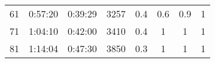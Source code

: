 \begin{table*}[]
\begin{center}
\begin{tabular}{c|cc|c|cccc}
61                       & 0:57:20                     & 0:39:29                                                                           & 3257                                & 0.4         & 0.6                 & \multicolumn{1}{c|}{0.9} & 1            \\
71                       & 1:04:10                     & 0:42:00                                                                           & 3410                                & 0.4         & 1                   & \multicolumn{1}{c|}{1}   & 1            \\
81                       & 1:14:04                     & 0:47:30                                                                           & 3850                                & 0.3         & 1                   & \multicolumn{1}{c|}{1}   & 1            \\ \hline
\end{tabular}
\end{center}
\end{table*}